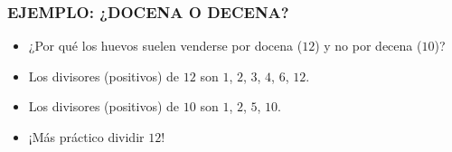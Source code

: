 \begin{frame}
  \frametitle{EJEMPLO: ¿DOCENA O DECENA?}

  \begin{minipage}[t][0.6\textheight]{0.6\textwidth}
    \vspace{0pt}
    \begin{itemize}
    \item<2-> ¿Por qué los huevos suelen venderse por docena ($12$) y no por
      decena ($10$)?

    \item<3-> Los divisores (positivos) de $12$ son $1$, $2$, $3$, $4$, $6$,
      $12$.

    \item<4-> Los divisores (positivos) de $10$ son $1$, $2$, $5$, $10$.

    \item<5-> ¡Más práctico dividir $12$!
    \end{itemize}
  \end{minipage}
  \begin{minipage}[t]{0.35\textwidth}
    \vspace{0pt}\flushright
  \end{minipage}
\end{frame}

